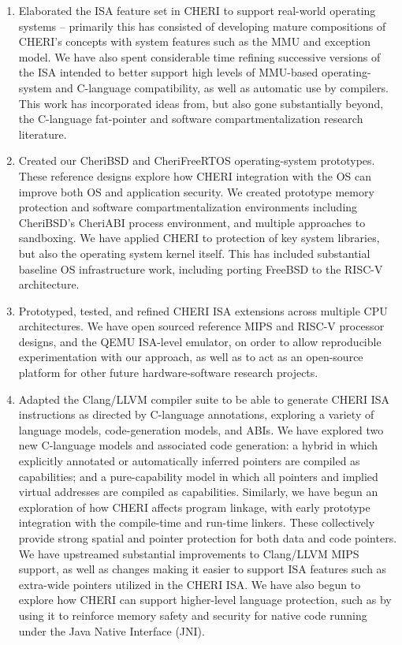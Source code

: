 \begin{enumerate}
\item Elaborated the ISA feature set in CHERI to support real-world operating
  systems -- primarily this has consisted of developing mature compositions of
  CHERI's concepts with system features such as the MMU and exception model.
  We have also spent considerable time refining successive versions of
  the ISA intended to better support high levels of MMU-based operating-system
  and C-language compatibility, as well as automatic use by compilers.
  This work has incorporated ideas from, but also gone substantially beyond,
  the C-language fat-pointer and software compartmentalization research
  literature.

\item Created our CheriBSD and CheriFreeRTOS operating-system prototypes.
  These reference designs explore how CHERI integration with the OS can
  improve both OS and application security.
  We created prototype memory protection and software compartmentalization
  environments including CheriBSD's CheriABI process environment, and multiple
  approaches to sandboxing.
  We have applied CHERI to protection of key system libraries, but also the
  operating system kernel itself.
  This has included substantial baseline OS infrastructure work, including
  porting FreeBSD to the RISC-V architecture.

\item Prototyped, tested, and refined CHERI ISA extensions across multiple CPU
  architectures.
  We have open sourced reference MIPS and RISC-V processor designs, and the
  QEMU ISA-level emulator, on order to allow reproducible experimentation with
  our approach, as well as to act as an open-source platform for other future
  hardware-software research projects.

\item Adapted the Clang/LLVM compiler suite to be able to generate CHERI ISA
  instructions as directed by C-language annotations, exploring a variety of
  language models, code-generation models, and ABIs.
  We have explored two new C-language models and associated code generation:
  a hybrid in which explicitly annotated or automatically inferred pointers
  are compiled as capabilities; and a pure-capability model in which all
  pointers and implied virtual addresses are compiled as capabilities.
  Similarly, we have begun an exploration of how CHERI affects program
  linkage, with early prototype integration with the compile-time and run-time
  linkers.
  These collectively provide strong spatial and pointer protection for both
  data and code pointers.
  We have upstreamed substantial improvements to Clang/LLVM MIPS support, as
  well as changes making it easier to support ISA features such as extra-wide
  pointers utilized in the CHERI ISA.
  We have also begun to explore how CHERI can support higher-level language
  protection, such as by using it to reinforce memory safety and security for
  native code running under the Java Native Interface (JNI).


\end{enumerate}
